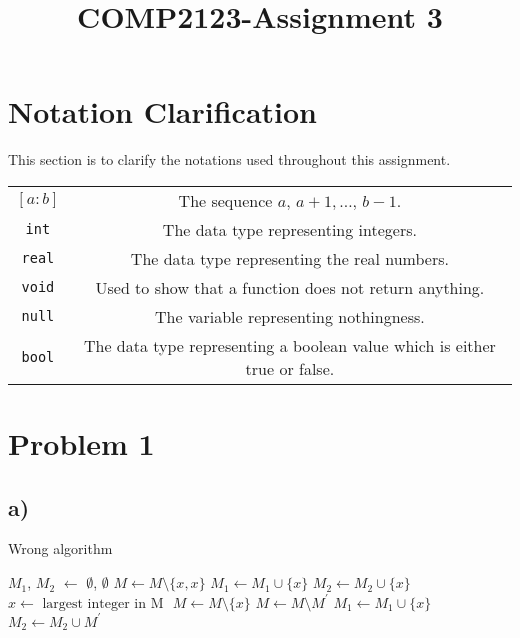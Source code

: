 \documentclass{article}
\title{COMP2123-Assignment 3}
\begin{document}
	\maketitle
	\section*{Notation Clarification}
	This section is to clarify the notations used throughout this assignment.
	
	\begin{center}
		\begin{tabular}{ c c }
			\([a:b]\) & The sequence \(a,\, a + 1, \ldots, \, b - 1\).\\
			\verb|int| & The data type representing integers.\\
			\verb|real| & The data type representing the real numbers.\\
			\verb|void| & Used to show that a function does not return anything.\\
			\verb|null| & The variable representing nothingness.\\
			\verb|bool| & The data type representing a boolean value which is either true or false.\\
		\end{tabular}
	\end{center} 

	\newpage \section*{Problem 1}

	\subsection*{a)}
	\begin{algorithm}[H]
		\caption{Wrong algorithm}
	\begin{algorithmic}[1]
		\State \(M_{1}\), \(M_{2}\) \(\gets\) \(\emptyset\), \(\emptyset\) 
			\State \(M \gets M \setminus \{x, x\}\) 
			\State \(M_{1} \gets M_{1} \cup \{x\}\) 
			\State \(M_{2} \gets M_{2} \cup \{x\}\) 
		\EndWhile{}
			\State \(x \gets \text{ largest integer in M }\)
			\State \(M \gets M \setminus \{x\}\) 
				\State \(M \gets M \setminus M^{'}\)  
				\State \(M_{1} \gets M_{1} \cup \{x\}\) 
				\State \(M_{2} \gets M_{2} \cup M^{'}\) 
			\Else{}
				\State {}
			\EndIf{}
		\EndWhile{}
		\State {}
		\EndFunction{}
	\end{algorithmic}
	\end{algorithm}
\end{document}
